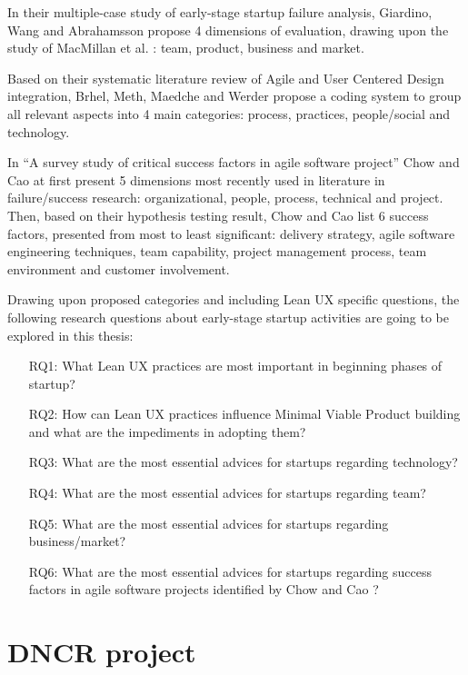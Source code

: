 \documentclass{article}
\begin{document}
In their multiple-case study of early-stage startup failure analysis, Giardino, Wang and Abrahamsson \cite{giardino2014early} propose 4 dimensions of evaluation, drawing upon the study of MacMillan et al. \cite{macmillan1987criteria}: team, product, business and market.

Based on their systematic literature review of Agile and User Centered Design integration, Brhel, Meth, Maedche and Werder \cite{brhel2015exploring} propose a coding system to group all relevant aspects into 4 main categories: process, practices, people/social and technology.

In ``A survey study of critical success factors in agile software project'' Chow and Cao \cite{cao2008agile} at first present 5 dimensions most recently used in literature in failure/success research: organizational, people, process, technical and project. Then, based on their hypothesis testing result, Chow and Cao list 6 success factors, presented from most to least significant: delivery strategy, agile software engineering techniques, team capability, project management process, team environment and customer involvement.

Drawing upon proposed categories and including Lean UX specific questions, the following research questions about early-stage startup activities are going to be explored in this thesis:

\begin{itemize}
\item[RQ1:] What Lean UX practices are most important in beginning phases of startup?
\item[RQ2:] How can Lean UX practices influence Minimal Viable Product building and what are the impediments in adopting them?
\item[RQ3:] What are the most essential advices for startups regarding technology?
\item[RQ4:] What are the most essential advices for startups regarding team?
\item[RQ5:] What are the most essential advices for startups regarding business/market?
\item[RQ6:] What are the most essential advices for startups regarding success factors in agile software projects identified by Chow and Cao \cite{cao2008agile}?
\end{itemize}

\section{DNCR project}
\label{sec:dncr-project}
\end{document}
